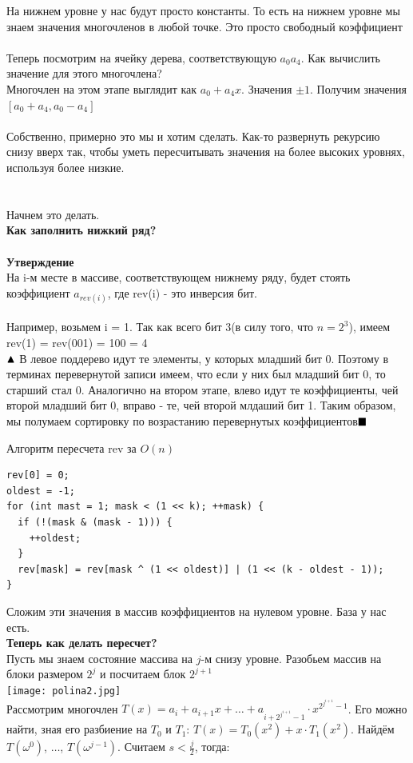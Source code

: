 На нижнем уровне у нас будут просто константы. То есть на нижнем уровне мы знаем значения многочленов в любой точке. Это просто свободный коэффициент
\\
\\
Теперь посмотрим на ячейку дерева, соответствующую $a_0 a_4$. Как вычислить значение для этого многочлена? 
\\
Многочлен на этом этапе выглядит как $a_0 + a_4 x$. Значения $\pm 1$. Получим значения $[a_0 + a_4, a_0 - a_4]$
\\
\\
Собственно, примерно это мы и хотим сделать. Как-то развернуть рекурсию снизу вверх так, чтобы уметь пересчитывать значения на более высоких уровнях, используя более низкие.
\\
\\
\\
Начнем это делать. \\
\textbf{Как заполнить нижкий ряд?} \\
\\
\textbf{Утверждение} \\
На i-м месте в массиве, соответствующем нижнему ряду, будет стоять коэффициент $a_{rev(i)}$, где rev(i) - это инверсия бит. \\  \\ Например, возьмем i = 1. Так как всего бит 3(в силу того, что $n = 2^3$), имеем rev(1) = rev(001) = 100 = 4
 \\
$\blacktriangle \\ $ В левое поддерево идут те элементы, у которых младший бит 0. Поэтому в терминах перевернутой записи имеем, что если у них был младший бит 0, то старший стал 0. Аналогично на втором этапе, влево идут те коэффициенты, чей второй младший бит 0, вправо - те, чей второй млдаший бит 1. Таким образом, мы полумаем сортировку по возрастанию перевернутых коэффициентов$ \\ \blacksquare $

Алгоритм пересчета rev за $O(n)$

\begin{lstlisting}
rev[0] = 0;
oldest = -1;
for (int mast = 1; mask < (1 << k); ++mask) {
  if (!(mask & (mask - 1))) {
    ++oldest;
  }
  rev[mask] = rev[mask ^ (1 << oldest)] | (1 << (k - oldest - 1));
}
\end{lstlisting}
Сложим эти значения в массив коэффициентов на нулевом уровне.
База у нас есть. 
\\
\textbf{Теперь как делать пересчет?}\\
Пусть мы знаем состояние массива на $j$-м снизу уровне. Разобьем массив на блоки размером $2^j$ и посчитаем блок $2^{j+1}$
\\
\texttt{[image: polina2.jpg]}\\
 Рассмотрим многочлен $T (x) = a_i + a_{i + 1} x + \dots + a_{i + 2^{j^{i + 1}} - 1} \cdot x^{2^{j^{i + 1}} - 1}$. Его можно найти, зная его разбиение на $T_0$ и $T_1$: $T (x) = T_0 (x^2) + x \cdot T_1(x^2)$. Найдём $T (\omega^0)$, $\dots$, $T (\omega^{j - 1})$. Считаем $s < \frac{j}{2}$, тогда: 

